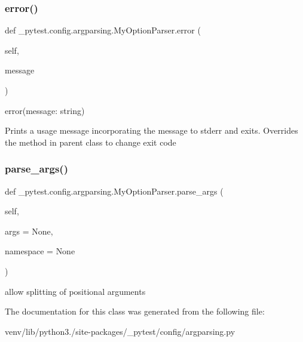 \subsubsection{\texorpdfstring{error()}{error()}}
{\footnotesize\ttfamily def \+\_\+pytest.\+config.\+argparsing.\+My\+Option\+Parser.\+error (\begin{DoxyParamCaption}\item[{}]{self,  }\item[{}]{message }\end{DoxyParamCaption})}

\begin{DoxyVerb}error(message: string)

Prints a usage message incorporating the message to stderr and
exits.
Overrides the method in parent class to change exit code\end{DoxyVerb}
 \mbox{\label{class__pytest_1_1config_1_1argparsing_1_1_my_option_parser_ace320dcd318376d6ad4116fafc1f0270}} 
\subsubsection{\texorpdfstring{parse\+\_\+args()}{parse\_args()}}
{\footnotesize\ttfamily def \+\_\+pytest.\+config.\+argparsing.\+My\+Option\+Parser.\+parse\+\_\+args (\begin{DoxyParamCaption}\item[{}]{self,  }\item[{}]{args = {\ttfamily None},  }\item[{}]{namespace = {\ttfamily None} }\end{DoxyParamCaption})}

\begin{DoxyVerb}allow splitting of positional arguments\end{DoxyVerb}
 

The documentation for this class was generated from the following file\+:\begin{DoxyCompactItemize}
\item 
venv/lib/python3./site-\/packages/\+\_\+pytest/config/argparsing.\+py\end{DoxyCompactItemize}
